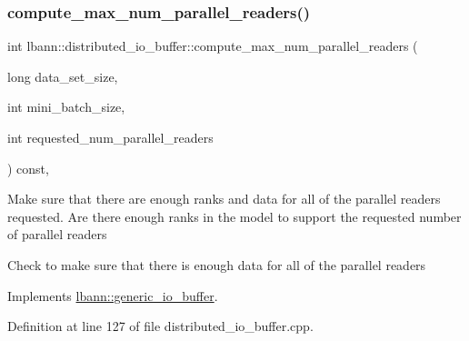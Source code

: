 \mbox{\label{classlbann_1_1distributed__io__buffer_af6653723714cf8cf51a928fc9f6e6728}} 
\subsubsection{\texorpdfstring{compute\+\_\+max\+\_\+num\+\_\+parallel\+\_\+readers()}{compute\_max\_num\_parallel\_readers()}}
{\footnotesize\ttfamily int lbann\+::distributed\+\_\+io\+\_\+buffer\+::compute\+\_\+max\+\_\+num\+\_\+parallel\+\_\+readers (\begin{DoxyParamCaption}\item[{long}]{data\+\_\+set\+\_\+size,  }\item[{int}]{mini\+\_\+batch\+\_\+size,  }\item[{int}]{requested\+\_\+num\+\_\+parallel\+\_\+readers }\end{DoxyParamCaption}) const\hspace{0.3cm}{\ttfamily [override]}, {\ttfamily [virtual]}}

Make sure that there are enough ranks and data for all of the parallel readers requested. Are there enough ranks in the model to support the requested number of parallel readers

Check to make sure that there is enough data for all of the parallel readers 

Implements \hyperlink{classlbann_1_1generic__io__buffer_affc26b29e3f9eaaae5c033648e1a0141}{lbann\+::generic\+\_\+io\+\_\+buffer}.



Definition at line 127 of file distributed\+\_\+io\+\_\+buffer.\+cpp.


